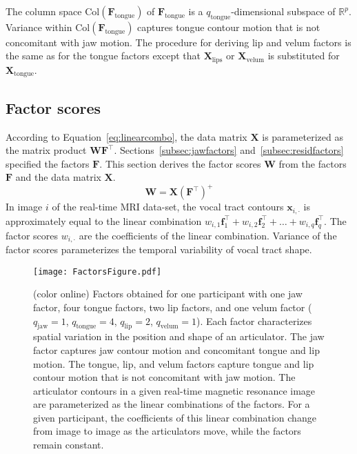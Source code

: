 \documentclass[preprint]{JASAnew}\usepackage[]{graphicx}\usepackage[]{color}
\begin{document}
The column space $\mathrm{Col}(\mathbf{F}_\text{tongue})$ of $\mathbf{F}_\text{tongue}$ is a $q_\text{tongue}$-dimensional subspace of $\mathbb{R}^p$. 
%
Variance within $\mathrm{Col}(\mathbf{F}_\text{tongue})$ captures tongue contour motion that is not concomitant with jaw motion. 
%
The procedure for deriving lip and velum factors is the same as for the tongue factors except that $\mathbf{X}_\text{lips}$ or $\mathbf{X}_\text{velum}$ is substituted for $\mathbf{X}_\text{tongue}$.




\subsection{Factor scores}
\label{subsec:weights}

According to Equation~\ref{eq:linearcombo}, the data matrix $\mathbf{X}$ is parameterized as the matrix product $\mathbf{W}\mathbf{F}^\intercal$. 
%
Sections~\ref{subsec:jawfactors} and~\ref{subsec:residfactors} specified the factors $\mathbf{F}$. 
%
This section derives the factor scores $\mathbf{W}$ from the factors $\mathbf{F}$ and the data matrix $\mathbf{X}$. 
%
\begin{equation}
\mathbf{W} 
 = \mathbf{X} \left( \mathbf{F}^\intercal \right) ^+
\end{equation}
%
In image $i$ of the real-time MRI data-set, the vocal tract contours $\mathbf{x}_{i,\cdot}$ is approximately equal to the linear combination $w_{i,1} \mathbf{f}_1^\intercal + w_{i,2} \mathbf{f}_2^\intercal + \ldots + w_{i,q} \mathbf{f}_q^\intercal$. The factor scores $w_{i,\cdot }$ are the coefficients of the linear combination. Variance of the factor scores parameterizes the temporal variability of vocal tract shape. 

\begin{figure}

\texttt{[image: FactorsFigure.pdf]}

\caption{(color online) Factors obtained for one participant with one jaw factor, four tongue factors, two lip factors, and one velum factor ($q_\text{jaw} = 1$, $q_\text{tongue} = 4$, $q_\text{lip} = 2$, $q_\text{velum} = 1$). 
Each factor characterizes spatial variation in the position and shape of an articulator. 
The jaw factor captures jaw contour motion and concomitant tongue and lip motion.
The tongue, lip, and velum factors capture tongue and lip contour motion that is not concomitant with jaw motion. 
The articulator contours in a given real-time magnetic resonance image are parameterized as the linear combinations of the factors. 
For a given participant, the coefficients of this linear combination change from image to image as the articulators move, while the factors remain constant.}
\label{fig:gfa}
\end{figure}
\end{document}
